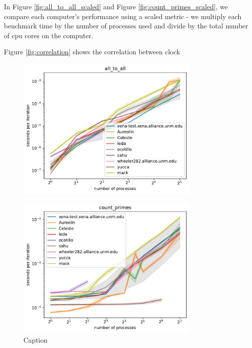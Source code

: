 \documentclass{article}
\begin{document}
In Figure \ref{fig:all_to_all_scaled} and Figure \ref{fig:count_primes_scaled}, we compare each computer's performance using a scaled metric - we multiply each benchmark time by the number of processes used and divide by the total number of cpu cores on the computer. 

Figure \ref{fig:correlation} shows the correlation between clock

\begin{figure}[h]
    \centering
    \includegraphics[width=0.8\textwidth]{figures/final/all_to_all.pdf}
    \caption{}
    \label{fig:all_to_all}
\end{figure}

\begin{figure}[h]
    \centering
    \includegraphics[width=0.8\textwidth]{figures/final/count_primes.pdf}
    \caption{Caption}
    \label{fig:count_primes}
\end{figure}
\end{document}
